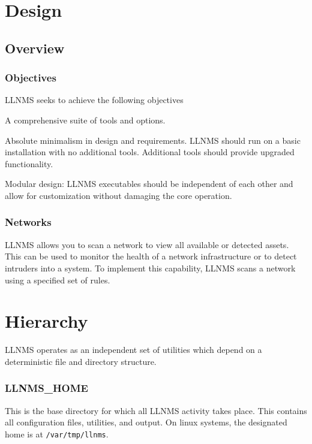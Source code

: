 \documentclass[12pt]{report}
\begin{document}
\section*{Design}

\subsection*{Overview}

\subsubsection*{Objectives}
LLNMS seeks to achieve the following objectives
\begin{declarative}
\item A comprehensive suite of tools and options.
\item Absolute minimalism in design and requirements.  LLNMS should run on a basic installation with no additional tools.  Additional tools should provide upgraded functionality.
\item [Modular design: ] LLNMS executables should be independent of each other and allow for customization without damaging the core operation. 
\end{declarative}

\subsubsection*{Networks}

LLNMS allows you to scan a network to view all available or detected assets.  This 
can be used to monitor the health of a network infrastructure or to detect intruders into
a system.  To implement this capability, LLNMS scans a network using a specified set of 
rules.  

\section*{Hierarchy}

LLNMS operates as an independent set of utilities which depend on 
a deterministic file and directory structure. 

\subsubsection*{LLNMS\_HOME}
This is the base directory for which all LLNMS activity takes place.  This
contains all configuration files, utilities, and output.  On linux systems, 
the designated home is at \texttt{/var/tmp/llnms}. 
\end{document}
